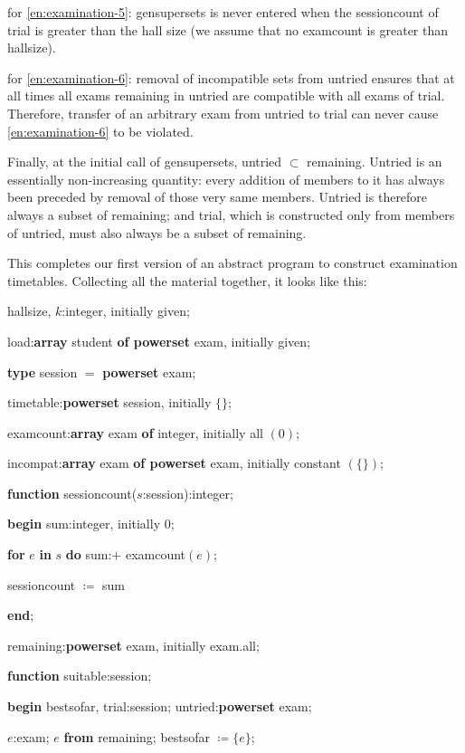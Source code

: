 \documentclass[twoside,11pt]{book}
\begin{document}
for \ref{en:examination-5}: gensupersets is never entered when the sessioncount of trial is greater than the hall size (we assume that no examcount is greater than hallsize).

for \ref{en:examination-6}: removal of incompatible sets from untried ensures that at all times all exams remaining in untried are compatible with all exams of trial. Therefore, transfer of an arbitrary exam from untried to trial can never cause \ref{en:examination-6} to be violated.

Finally, at the initial call of gensupersets, untried $\subset$ remaining. Untried is an essentially non-increasing quantity: every addition of members to it has always been preceded by removal of those very same members. Untried is therefore always a subset of remaining; and trial, which is constructed only from members of untried, must also always be a subset of remaining.

This completes our first version of an abstract program to construct examination timetables. Collecting all the material together, it looks like this:

hallsize, $k$:integer, initially given;

load:\textbf{array} student \textbf{of powerset} exam, initially given;

\textbf{type} session $=$ \textbf{powerset} exam;

timetable:\textbf{powerset} session, initially $\{\}$;

examcount:\textbf{array} exam \textbf{of} integer, initially all $(0)$;

incompat:\textbf{array} exam \textbf{of powerset} exam, initially constant $(\{\})$;

\textbf{function} sessioncount($s$:session):integer;

\quad \textbf{begin} sum:integer, initially 0;

\quad \quad \textbf{for} $e$ \textbf{in} $s$ \textbf{do} sum:$+$ examcount$(e)$;

\quad \quad sessioncount $\coloneq$ sum

\quad \textbf{end};

\quad remaining:\textbf{powerset} exam, initially exam.all;

\textbf{function} suitable:session;

\quad \textbf{begin} bestsofar, trial:session; untried:\textbf{powerset} exam;

\quad \quad $e$:exam; $e$ \textbf{from} remaining; bestsofar $\coloneq \{e\}$;
\end{document}
